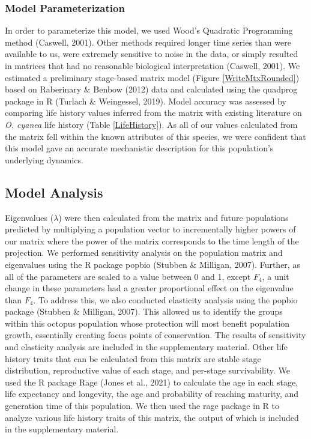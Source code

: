 \documentclass[
]{article}
\begin{document}
\hypertarget{model-parameterization}{%
\subsubsection{Model Parameterization}\label{model-parameterization}}

In order to parameterize this model, we used Wood's Quadratic Programming method (Caswell, 2001). Other methods required longer time series than were available to us, were extremely sensitive to noise in the data, or simply resulted in matrices that had no reasonable biological interpretation (Caswell, 2001). We estimated a preliminary stage-based matrix model (Figure \ref{WriteMtxRounded}) based on Raberinary \& Benbow (2012) data and calculated using the quadprog package in R (Turlach \& Weingessel, 2019). Model accuracy was assessed by comparing life history values inferred from the matrix with existing literature on \emph{O. cyanea} life history (Table \ref{LifeHistory}). As all of our values calculated from the matrix fell within the known attributes of this species, we were confident that this model gave an accurate mechanistic description for this population's underlying dynamics.

\hypertarget{model-analysis}{%
\subsection{Model Analysis}\label{model-analysis}}

Eigenvalues (\(\lambda\)) were then calculated from the matrix and future populations predicted by multiplying a population vector to incrementally higher powers of our matrix where the power of the matrix corresponds to the time length of the projection. We performed sensitivity analysis on the population matrix and eigenvalues using the R package popbio (Stubben \& Milligan, 2007). Further, as all of the parameters are scaled to a value between 0 and 1, except \(F_4\), a unit change in these parameters had a greater proportional effect on the eigenvalue than \(F_4\). To address this, we also conducted elasticity analysis using the popbio package (Stubben \& Milligan, 2007). This allowed us to identify the groups within this octopus population whose protection will most benefit population growth, essentially creating focus points of conservation. The results of sensitivity and elasticity analysis are included in the supplementary material. Other life history traits that can be calculated from this matrix are stable stage distribution, reproductive value of each stage, and per-stage survivability. We used the R package Rage (Jones et al., 2021) to calculate the age in each stage, life expectancy and longevity, the age and probability of reaching maturity, and generation time of this population. We then used the rage package in R to analyze various life history traits of this matrix, the output of which is included in the supplementary material.
\end{document}
